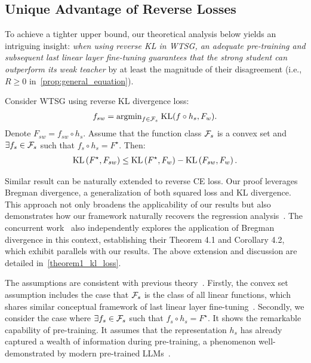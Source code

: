 \subsection{Unique Advantage of Reverse Losses} \label{sec:upper}

To achieve a tighter upper bound, our theoretical analysis below yields an intriguing insight: \textit{when using reverse KL in WTSG, an adequate pre-training and subsequent last linear layer fine-tuning guarantees that the strong student can outperform its weak teacher} by at least the magnitude of their disagreement (i.e., $R \ge 0$ in~\cref{prop:general_equation}).

\begin{theorem}
\label{thm:realizable}
Consider WTSG using reverse KL divergence loss:
\begin{align*}
    f_{sw} = \text{argmin}_{f \in \mathcal{F}_{s}}\; \mathrm{KL}(f \circ h_s, F_w).
\end{align*}
Denote $F_{sw}=f_{sw} \circ h_s$.
Assume that the function class $\mathcal{F}_{s}$ is a convex set and $\exists f_s \in \mathcal{F}_s$ such that $f_s \circ h_s = F^\star$.
Then:
\begin{align*}
    \mathrm{KL}\left(F^\star, F_{sw}\right) \leq \mathrm{KL}\left(F^\star, F_w\right)-\mathrm{KL}\left(F_{sw}, F_w\right).
\end{align*}
\end{theorem}


\begin{remark}
Similar result can be naturally extended to reverse CE loss.
Our proof leverages Bregman divergence, a generalization of both squared loss and KL divergence. 
This approach not only broadens the applicability of our results but also demonstrates how our framework naturally recovers the regression analysis~\citep{charikar2024quantifying}.
The concurrent work~\citep{mulgund2025relating} also independently explores the application of Bregman divergence in this context, establishing their Theorem 4.1 and Corollary 4.2, which exhibit parallels with our results.
The above extension and discussion are detailed in~\cref{theorem1_kl_loss}.
\end{remark}


The assumptions are consistent with previous theory~\citep{charikar2024quantifying,yao2025understanding}.
Firstly, the convex set assumption includes the case that $\mathcal{F}_s$ is the class of all linear functions, which shares similar conceptual framework of last linear layer fine-tuning~\citep{howard2018universal,kumar2022fine,mao2023last,kirichenko2023last}.
Secondly, we consider the case where $\exists f_s \in \mathcal{F}_s$ such that $f_s \circ h_s = F^\star$.
It shows the remarkable capability of pre-training. 
It assumes that the representation $h_s$ has already captured a wealth of information during pre-training, a phenomenon well-demonstrated by modern pre-trained LLMs~\citep{touvron2023llama,achiam2023gpt}.

